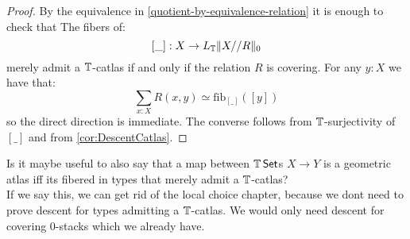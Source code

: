 \begin{proof}
	By the equivalence in \ref{quotient-by-equivalence-relation} it is enough to check that
		The fibers of: 
		\[[\_]:X\to L_{\mathbb{T}} \| X//R \|_0\] 
		merely admit a $\mathbb{T}$-catlas if and only if the relation $R$ is covering. For any $y:X$ we have that:
		\[\sum_{x:X} R(x,y) \simeq \mathrm{fib}_{[\_]}([y])\]
		so the direct direction is immediate. The converse follows from $\mathbb{T}$-surjectivity of $[\_]$ and from \ref{cor:DescentCatlas}.
\end{proof}
\begin{think}{\label{think:getRidOfLocalChoice}}
	Is it maybe useful to also say that a map between $\mathbb{T} \operatorname{\mathsf {Set}}$s $X \to Y$ is a geometric atlas iff its fibered in types that merely admit a $\mathbb{T}$-catlas? \\
	If we say this, we can get rid of the local choice chapter, because we dont need to prove descent for types admitting a $\mathbb{T}$-catlas. We would only need descent for covering 0-stacks which we already have.
\end{think}
